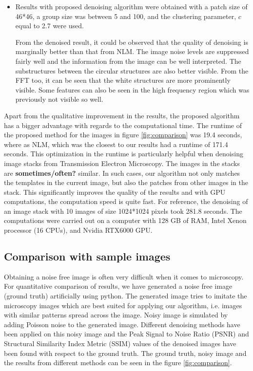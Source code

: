 \documentclass[fleqn,10pt]{wlscirep}
\begin{document}
\begin{itemize}
	\item Results with proposed denoising algorithm were obtained with a patch size of 46*46, a group size was between 5 and 100, and the clustering parameter, $c$ equal to 2.7 were used. 
	
	From the denoised result, it could be observed that the quality of denoising is marginally better than that from NLM. The image noise levels are suppressed fairly well and the information from the image can be well interpreted. The substructures between the circular structures are also better visible. From the FFT too, it can be seen that the white structures are more prominently visible. Some features can also be seen in the high frequency region which was previously not visible so well.
\end{itemize}

Apart from the qualitative improvement in the results, the proposed algorithm has a bigger advantage with regards to the computational time. The runtime of the proposed method for the images in figure \ref{fig:comparison} was 19.4 seconds, where as NLM, which was the closest to our results had a runtime of 171.4 seconds. This optimization in the runtime is particularly helpful when denoising image stacks from Transmission Electron Microscopy. The images in the stacks are \textbf{sometimes/often?} similar. In such cases, our algorithm not only matches the templates in the current image, but also the patches from other images in the stack. This significantly improves the quality of the results and with GPU computations, the computation speed is quite fast. For reference, the denoising of an image stack with 10 images of size 1024*1024 pixels took 281.8 seconds. The computations were carried out on a computer with 128 GB of RAM, Intel Xenon processor (16 CPUs), and Nvidia RTX6000 GPU.

\subsection*{Comparison with sample images}

Obtaining a noise free image is often very difficult when it comes to microscopy. For quantitative comparison of results, we have generated a noise free image (ground truth) artificially using python. The generated image tries to imitate the microscopy images which are best suited for applying our algorithm, i.e. images with similar patterns spread across the image. Noisy image is simulated by adding Poisson noise to the generated image. Different denoising methods have been applied on this noisy image and the Peak Signal to Noise Ratio (PSNR) and Structural Similarity Index Metric (SSIM) values of the denoised images have been found with respect to the ground truth. The ground truth, noisy image and the results from different methods can be seen in the figure \ref{fig:comparison}. 
\end{document}
